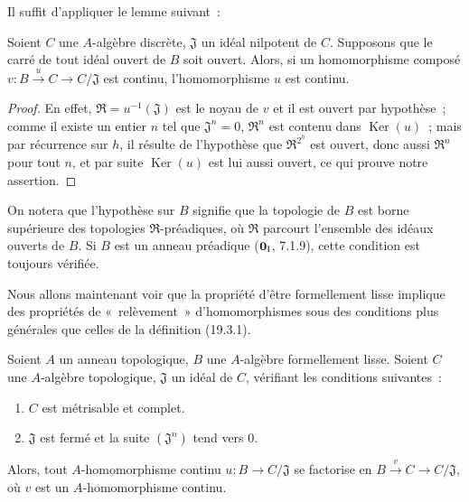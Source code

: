 Il suffit d'appliquer le lemme suivant~:

\begin{lemma}[19.3.8.1]
\label{0.19.3.8.1-fr}
Soient $C$ une $A$-algèbre discrète, $\mathfrak J$ un idéal nilpotent de $C$.
Supposons que le carré de tout idéal ouvert de $B$ soit ouvert. Alors, si un
homomorphisme composé
$v:B\xrightarrow{u}C\to C/\mathfrak J$ est continu, l'homomorphisme $u$
est continu.
\end{lemma}

\begin{proof}
En effet, $\mathfrak R=u^{-1}(\mathfrak J)$ est le noyau de $v$ et il est
ouvert par hypothèse~; comme il existe un entier $n$ tel que
$\mathfrak J^n=0$, $\mathfrak R^n$ est contenu dans
$\operatorname{Ker}(u)$~; mais par récurrence sur $h$, il résulte de
l'hypothèse que $\mathfrak R^{2^h}$ est ouvert, donc aussi
$\mathfrak R^n$ pour tout $n$, et par suite $\operatorname{Ker}(u)$ est lui
aussi ouvert, ce qui prouve notre assertion.
\end{proof}

On notera que l'hypothèse sur $B$ signifie que la topologie de $B$ est borne
supérieure des topologies $\mathfrak R$-préadiques, où $\mathfrak R$ parcourt
l'ensemble des idéaux ouverts de $B$. Si $B$ est un anneau préadique
($\mathbf 0_{\rm I}$, 7.1.9), cette condition est toujours vérifiée.

\begin{env}[19.3.9]
\label{0.19.3.9-fr}
Nous allons maintenant voir que la propriété d'être formellement lisse
implique des propriétés de «~relèvement~» d'homomorphismes sous des conditions
plus générales que celles de la définition (19.3.1).
\end{env}


\begin{proposition}[19.3.10]
\label{0.19.3.10-fr}
Soient $A$ un anneau topologique, $B$ une $A$-algèbre formellement lisse.
Soient $C$ une $A$-algèbre topologique, $\mathfrak J$ un idéal de $C$,
vérifiant les conditions suivantes~:
\begin{enumerate}
  \item[$1^\circ$] $C$ est métrisable et complet.
  \item[$2^\circ$] $\mathfrak J$ est fermé et la suite
  $(\mathfrak J^n)$ tend vers $0$.
\end{enumerate}
Alors, tout $A$-homomorphisme continu $u:B\to C/\mathfrak J$ se factorise en
$B\xrightarrow{v}C\to C/\mathfrak J$, où $v$ est un
$A$-homomorphisme continu.
\end{proposition}

